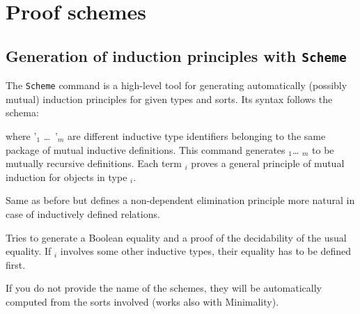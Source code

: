 \chapter{Proof schemes}

\section{Generation of induction principles with {\tt Scheme}}
\label{Scheme}

The {\tt Scheme} command is a high-level tool for generating
automatically (possibly mutual) induction principles for given types
and sorts.  Its syntax follows the schema:
\begin{quote}
{}
\end{quote}
where \ident'$_1$ \dots\ \ident'$_m$ are different inductive type
identifiers belonging to the same package of mutual inductive
definitions. This command generates {\ident$_1$}\dots{} {\ident$_m$}
to be mutually recursive definitions. Each term {\ident$_i$} proves a
general principle of mutual induction for objects in type {\term$_i$}.

\begin{Variants}
\item {}

  Same as before but defines a non-dependent elimination principle more
  natural in case of inductively defined relations.

\item {}

  Tries to generate a Boolean equality and a proof of the
  decidability of the usual equality. If \ident$_i$ involves
  some other inductive types, their equality has to be defined first.

\item {}

  If you do not provide the name of the schemes, they will be automatically
  computed from the sorts involved (works also with Minimality).

\end{Variants}
\label{Scheme-examples}

